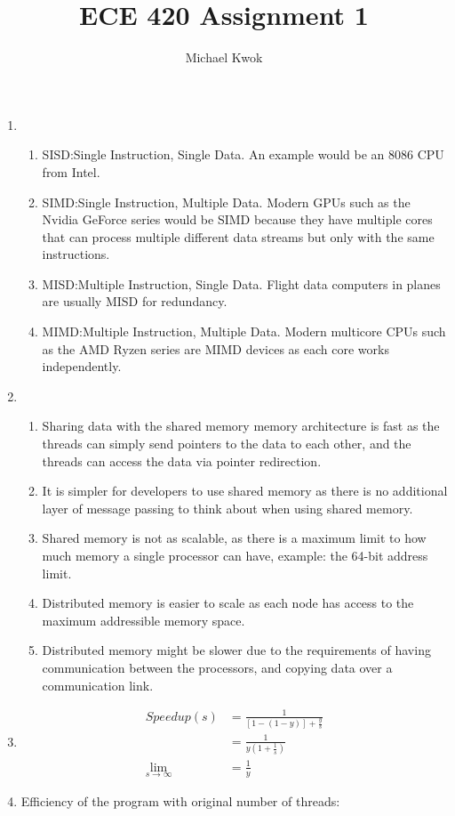 \documentclass{article}
\title{ECE 420 Assignment 1}
\author{Michael Kwok}
\begin{document}
\maketitle
\begin{enumerate}
    \item \begin{enumerate}
              \item SISD:\@ Single Instruction, Single Data. An example would be an 8086 CPU from Intel.
              \item SIMD:\@ Single Instruction, Multiple Data. Modern GPUs such as the Nvidia GeForce series would be SIMD because they have multiple cores that can process multiple different data streams but only with the same instructions.
              \item MISD:\@ Multiple Instruction, Single Data. Flight data computers in planes are usually MISD for redundancy.
              \item MIMD:\@ Multiple Instruction, Multiple Data. Modern multicore CPUs such as the AMD Ryzen series are MIMD devices as each core works independently.
          \end{enumerate}
    \item  \begin{enumerate}
              \item Sharing data with the shared memory memory architecture is fast as the threads can simply send pointers to the data to each other, and the threads can access the data via pointer redirection.
              \item It is simpler for developers to use shared memory as there is no additional layer of message passing to think about when using shared memory.
              \item Shared memory is not as scalable, as there is a maximum limit to how much memory a single processor can have, example: the 64-bit address limit.
              \item Distributed memory is easier to scale as each node has access to the maximum addressible memory space.
              \item Distributed memory might be slower due to the requirements of having communication between the processors, and copying data over a communication link.
          \end{enumerate}
    \item \begin{align}
              Speedup\left(s\right) & = \frac{1}{\left[1 - \left(1 - y\right)\right] + \frac{y}{s}} \\
                                    & = \frac{1}{y \left(1 + \frac{1}{s}\right)}                    \\
              \lim_{s \to \infty}   & = \frac{1}{y}
          \end{align}
    \item Efficiency of the program with original number of threads:


\end{enumerate}
\end{document}
